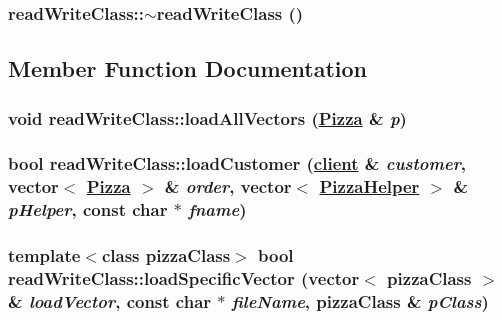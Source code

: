\hypertarget{classread_write_class_17d5dddd8a25946f62055c4d78fb22d8}{
\subsubsection[$\sim$readWriteClass]{\setlength{\rightskip}{0pt plus 5cm}read\-Write\-Class::$\sim$read\-Write\-Class ()}}
\label{classread_write_class_17d5dddd8a25946f62055c4d78fb22d8}




\subsection{Member Function Documentation}
\hypertarget{classread_write_class_7a6da2d64d652963e15693695f38b019}{
\subsubsection[loadAllVectors]{\setlength{\rightskip}{0pt plus 5cm}void read\-Write\-Class::load\-All\-Vectors (\hyperlink{class_pizza}{Pizza} \& {\em p})}}
\label{classread_write_class_7a6da2d64d652963e15693695f38b019}


\hypertarget{classread_write_class_b078183ae301dfe3e5197f25677d3abc}{
\subsubsection[loadCustomer]{\setlength{\rightskip}{0pt plus 5cm}bool read\-Write\-Class::load\-Customer (\hyperlink{classclient}{client} \& {\em customer}, vector$<$ \hyperlink{class_pizza}{Pizza} $>$ \& {\em order}, vector$<$ \hyperlink{class_pizza_helper}{Pizza\-Helper} $>$ \& {\em p\-Helper}, const char $\ast$ {\em fname})}}
\label{classread_write_class_b078183ae301dfe3e5197f25677d3abc}


\hypertarget{classread_write_class_c853fce40cfb6790d054df75b933889f}{
\subsubsection[loadSpecificVector]{\setlength{\rightskip}{0pt plus 5cm}template$<$class pizza\-Class$>$ bool read\-Write\-Class::load\-Specific\-Vector (vector$<$ pizza\-Class $>$ \& {\em load\-Vector}, const char $\ast$ {\em file\-Name}, pizza\-Class \& {\em p\-Class})}}
\label{classread_write_class_c853fce40cfb6790d054df75b933889f}


